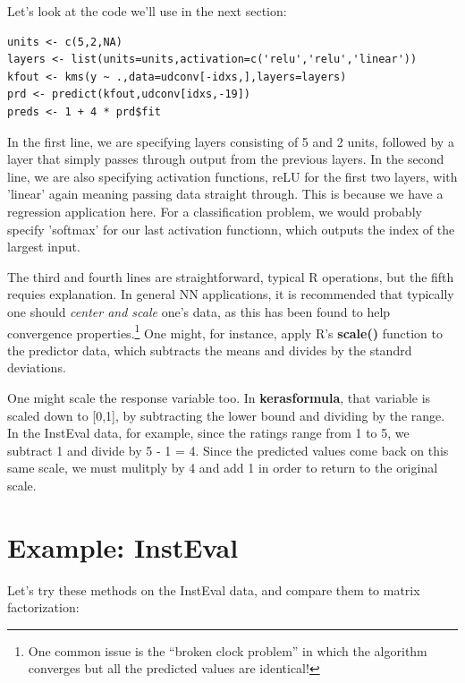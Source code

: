 Let's look at the code we'll use in the next section:

\begin{lstlisting}
units <- c(5,2,NA)
layers <- list(units=units,activation=c('relu','relu','linear')) 
kfout <- kms(y ~ .,data=udconv[-idxs,],layers=layers) 
prd <- predict(kfout,udconv[idxs,-19]) 
preds <- 1 + 4 * prd$fit
\end{lstlisting}

In the first line, we are specifying layers consisting of 5 and 2 units,
followed by a layer that simply passes through output from the previous
layers.  In the second line, we are also specifying activation
functions, reLU for the first two layers, with 'linear' again meaning
passing data straight through.  This is because we have a regression
application here.  For a classification problem, we would probably
specify 'softmax' for our last activation functionn, which outputs the
index of the largest input.

The third and fourth lines are straightforward, typical R operations,
but the fifth requies explanation.  In general NN applications, it is
recommended that typically one should \textit{center and scale} one's
data, as this has been found to help convergence
properties.\footnote{One common issue is the ``broken clock problem'' in
which the algorithm converges but all the predicted values are
identical!}  One might, for instance, apply R's \textbf{scale()}
function to the predictor data, which subtracts the means and divides by
the standrd deviations.

One might scale the response variable too.  In \textbf{kerasformula},
that variable is scaled down to [0,1], by subtracting the lower bound
and dividing by the range.  In the InstEval data, for example, since the
ratings range from 1 to 5, we subtract 1 and divide by 5 - 1 = 4.
Since the predicted values come back on this same scale, we must
mulitply by 4 and add 1 in order to return to the original scale.


\section{Example: InstEval}

Let's try these methods on the InstEval data, and compare them to matrix
factorization:

